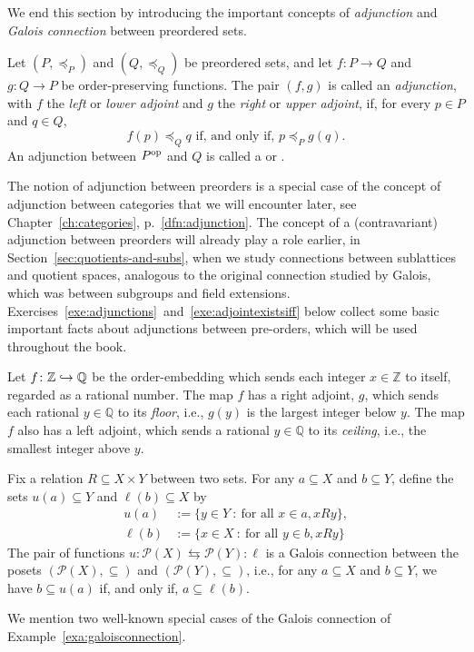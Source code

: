 We end this section by introducing the important concepts of \emph{adjunction} and \emph{Galois connection} between preordered sets. 
\begin{definition}\label{dfn:poset-adjunction-def}
  Let $(P,\preceq_P)$ and $(Q,\preceq_Q)$ be preordered sets, and let $f \colon P \to Q$ and $g \colon Q \to P$ be order-preserving functions. The pair $(f,g)$ is called an \emph{adjunction}, with $f$ the \emph{left} or \emph{lower adjoint} and $g$ the \emph{right} or \emph{upper adjoint}, if, for every $p \in P$ and $q \in Q$,
\[ f(p) \preceq_Q q \text{ if, and only if, } p \preceq_P g(q).\]
An adjunction between $P^{\mathrm{op}}$ and $Q$ is called a  or .
\end{definition}
The notion of adjunction between preorders is a special case of the concept of adjunction between categories that we will encounter later, see Chapter~\ref{ch:categories}, p.~\ref{dfn:adjunction}. The concept of a (contravariant) adjunction between preorders will already play a role earlier, in Section~\ref{sec:quotients-and-subs}, when we study connections between sublattices and quotient spaces, analogous to the original connection studied by Galois, which was between subgroups and field extensions. Exercises~\ref{exe:adjunctions}~and~\ref{exe:adjointexistsiff} below collect some basic important facts about adjunctions between pre-orders, which will be used throughout the book.

\begin{example}
  Let $f \colon \mathbb{Z} \hookrightarrow \mathbb{Q}$ be the order-embedding which sends each integer $x \in \mathbb{Z}$ to itself, regarded as a rational number. The map $f$ has a right adjoint, $g$, which sends each rational $y \in \mathbb{Q}$ to its \emph{floor}, i.e., $g(y)$ is the largest integer below $y$. The map $f$ also has a left adjoint, which sends a rational $y \in \mathbb{Q}$ to its \emph{ceiling}, i.e., the smallest integer above $y$.
\end{example}
\begin{example}\label{exa:galoisconnection}
  Fix a relation $R \subseteq X \times Y$ between two sets. For any $a \subseteq X$ and $b \subseteq Y$, define the sets $u(a) \subseteq Y$ and $\ell(b) \subseteq X$ by
  \begin{align*}
    u(a) &:= \{y \in Y \ \colon \ \text{for all } x \in a, x {R} y \}, \\
  \ell(b) &:= \{ x \in X \ \colon \ \text{for all } y \in b, x {R} y \}
  \end{align*}
  The pair of functions $u \colon \mathcal{P}(X) \leftrightarrows \mathcal{P}(Y) \colon \ell$ is a Galois connection between the posets $(\mathcal{P}(X), \subseteq)$ and $(\mathcal{P}(Y), \subseteq)$, i.e., for any $a \subseteq X$ and $b \subseteq Y$, we have $b \subseteq u(a)$ if, and only if, $a \subseteq \ell(b)$.
\end{example}
  We mention two well-known special cases of the Galois connection of Example~\ref{exa:galoisconnection}.
  
